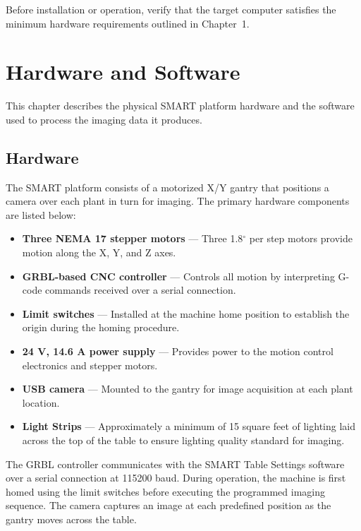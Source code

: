 \documentclass[12pt,a4paper,oneside]{report}
\begin{document}
Before installation or operation, verify that the target computer satisfies the minimum hardware requirements outlined in Chapter~1.

\cleardoublepage

\chapter{Hardware and Software}

This chapter describes the physical SMART platform hardware and the software used to process the imaging data it produces.

\section{Hardware}

The SMART platform consists of a motorized X/Y gantry that positions a camera over each plant in turn for imaging. The primary hardware components are listed below:

\begin{itemize}
    \item \textbf{Three NEMA 17 stepper motors} --- Three 1.8$^\circ$ per step motors provide motion along the X, Y, and Z axes.
    \item \textbf{GRBL-based CNC controller} --- Controls all motion by interpreting G-code commands received over a serial connection.
    \item \textbf{Limit switches} --- Installed at the machine home position to establish the origin during the homing procedure.
    \item \textbf{24 V, 14.6 A power supply} --- Provides power to the motion control electronics and stepper motors.
    \item \textbf{USB camera} --- Mounted to the gantry for image acquisition at each plant location.
    \item \textbf{Light Strips} --- Approximately a minimum of 15 square feet of lighting laid across the top of the table to ensure lighting quality standard for imaging.
\end{itemize}

The GRBL controller communicates with the SMART Table Settings software over a serial connection at 115200 baud. During operation, the machine is first homed using the limit switches before executing the programmed imaging sequence. The camera captures an image at each predefined position as the gantry moves across the table.
\end{document}
